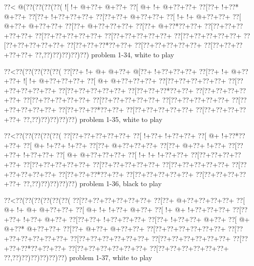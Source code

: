 \vbox{\vbox{\goo
\0??<\- @(\0??(\0??(\0??(\0??(
\- ![\- !+\- @+\0??+\- @+\0??+
\0??[\- @+\- !+\- @+\0??+\0??+
\0??[\0??+\- !+\0??*\- @+\0??+
\0??[\0??+\- !+\0??+\0??+\0??+
\0??[\0??+\0??+\- @+\0??+\0??+
\0??[\- !+\- !+\- @+\0??+\0??+
\0??[\- @+\0??+\- @+\0??+\0??+
\0??[\0??+\- @+\0??+\0??+\0??+
\0??[\0??+\- @+\0??*\0??+\0??+
\0??[\0??+\0??+\0??+\0??+\0??+
\0??[\0??+\0??+\0??+\0??+\0??+
\0??[\0??+\0??+\0??+\0??+\0??+
\0??[\0??+\0??+\0??+\0??+\0??+
\0??[\0??+\0??+\0??+\0??+\0??+
\0??[\0??+\0??+\0??*\0??+\0??+
\0??[\0??+\0??+\0??+\0??+\0??+
\0??[\0??+\0??+\0??+\0??+\0??+
\0??,\0??)\0??)\0??)\0??)\0??)
}
\hfil problem 1-34, white to play\hfil\break
}

\vbox{\vbox{\goo
\0??<\0??(\0??(\0??(\0??(\0??(
\0??[\0??+\- !+\- @+\- @+\0??+
\- @[\0??+\- !+\0??+\0??+\0??+
\0??[\0??+\- !+\- @+\0??+\0??+
\- ![\- !+\- @+\0??+\0??+\0??+
\0??[\- @+\- @+\0??+\0??+\0??+
\0??[\0??+\0??+\0??+\0??+\0??+
\0??[\0??+\0??+\0??+\0??+\0??+
\0??[\0??+\0??+\0??+\0??+\0??+
\0??[\0??+\0??+\0??*\0??+\0??+
\0??[\0??+\0??+\0??+\0??+\0??+
\0??[\0??+\0??+\0??+\0??+\0??+
\0??[\0??+\0??+\0??+\0??+\0??+
\0??[\0??+\0??+\0??+\0??+\0??+
\0??[\0??+\0??+\0??+\0??+\0??+
\0??[\0??+\0??+\0??*\0??+\0??+
\0??[\0??+\0??+\0??+\0??+\0??+
\0??[\0??+\0??+\0??+\0??+\0??+
\0??,\0??)\0??)\0??)\0??)\0??)
}
\hfil problem 1-35, white to play\hfil\break
}

\vbox{\vbox{\goo
\0??<\0??(\0??(\0??(\0??(\0??(
\0??[\0??+\0??+\0??+\0??+\0??+
\0??[\- !+\0??+\- !+\0??+\0??+
\0??[\- @+\- !+\0??*\0??+\0??+
\0??[\- @+\- !+\0??+\- !+\0??+
\0??[\0??+\- @+\0??+\0??+\0??+
\0??[\0??+\- @+\0??+\- !+\0??+
\0??[\0??+\0??+\- !+\0??+\0??+
\0??[\- @+\- @+\0??+\0??+\0??+
\0??[\- !+\- !+\- !+\0??+\0??+
\0??[\0??+\0??+\0??+\0??+\0??+
\0??[\0??+\0??+\0??+\0??+\0??+
\0??[\0??+\0??+\0??+\0??+\0??+
\0??[\0??+\0??+\0??+\0??+\0??+
\0??[\0??+\0??+\0??+\0??+\0??+
\0??[\0??+\0??+\0??*\0??+\0??+
\0??[\0??+\0??+\0??+\0??+\0??+
\0??[\0??+\0??+\0??+\0??+\0??+
\0??,\0??)\0??)\0??)\0??)\0??)
}
\hfil problem 1-36, black to play\hfil\break
}

\vbox{\vbox{\goo
\0??<\0??(\0??(\0??(\0??(\0??(\0??(
\0??[\0??+\0??+\0??+\0??+\0??+\0??+
\0??[\0??+\- @+\0??+\0??+\0??+\0??+
\0??[\- @+\- !+\- @+\- @+\0??+\0??+
\0??[\- @+\- !+\- !+\0??+\- @+\0??+
\0??[\- !+\- @+\- !+\0??+\0??+\0??+
\0??[\0??+\0??+\- !+\0??+\- @+\0??+
\0??[\0??+\0??+\- !+\0??+\0??+\0??+
\0??[\0??+\- !+\0??+\0??+\- @+\0??+
\0??[\- @+\- @+\0??*\- @+\0??+\0??+
\0??[\0??+\- @+\0??+\- @+\0??+\0??+
\0??[\0??+\0??+\0??+\0??+\0??+\0??+
\0??[\0??+\0??+\0??+\0??+\0??+\0??+
\0??[\0??+\0??+\0??+\0??+\0??+\0??+
\0??[\0??+\0??+\0??+\0??+\0??+\0??+
\0??[\0??+\0??+\0??*\0??+\0??+\0??+
\0??[\0??+\0??+\0??+\0??+\0??+\0??+
\0??[\0??+\0??+\0??+\0??+\0??+\0??+
\0??,\0??)\0??)\0??)\0??)\0??)\0??)
}
\hfil problem 1-37, white to play\hfil\break
}

